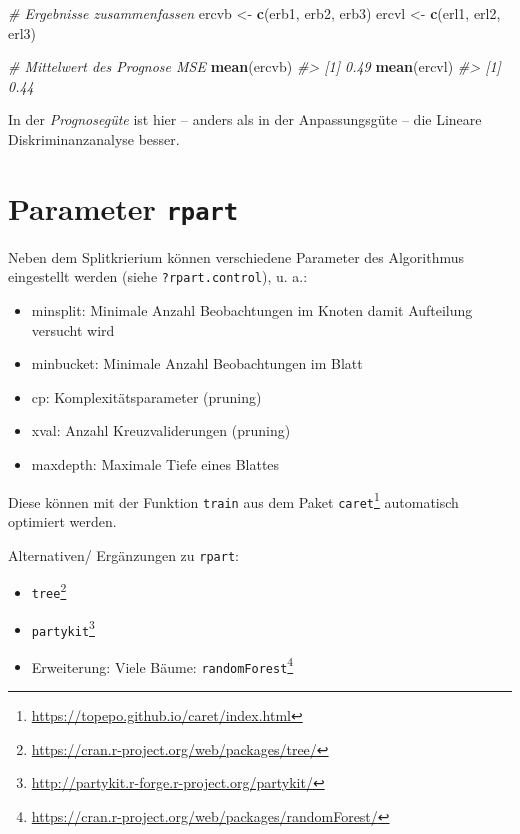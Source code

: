 \documentclass[12pt,]{book}
\makeatletter
\newenvironment{Shaded}{\begin{snugshade}}{\end{snugshade}}
\newcommand{\KeywordTok}[1]{\textcolor[rgb]{0.13,0.29,0.53}{\textbf{{#1}}}}
\newcommand{\StringTok}[1]{\textcolor[rgb]{0.31,0.60,0.02}{{#1}}}
\newcommand{\CommentTok}[1]{\textcolor[rgb]{0.56,0.35,0.01}{\textit{{#1}}}}
\newcommand{\NormalTok}[1]{{#1}}
\providecommand{\tightlist}{%
  \setlength{\itemsep}{0pt}\setlength{\parskip}{0pt}}
\renewcommand{\href}[2]{#2\footnote{\url{#1}}}
\newenvironment{kframe}{%
\medskip{}
\setlength{\fboxsep}{.8em}
 \def\at@end@of@kframe{}%
 \ifinner\ifhmode%
  \def\at@end@of@kframe{\end{minipage}}%
  \begin{minipage}{\columnwidth}%
 \fi\fi%
 \def\FrameCommand##1{\hskip\@totalleftmargin \hskip-\fboxsep
 \colorbox{shadecolor}{##1}\hskip-\fboxsep
     \hskip-\linewidth \hskip-\@totalleftmargin \hskip\columnwidth}%
 \MakeFramed {\advance\hsize-\width
   \@totalleftmargin\z@ \linewidth\hsize
   \@setminipage}}%
 {\par\unskip\endMakeFramed%
 \at@end@of@kframe}
\renewenvironment{Shaded}{\begin{kframe}}{\end{kframe}}
\makeatother
\begin{document}
\begin{Shaded}
\begin{Highlighting}[]
\CommentTok{# Ergebnisse zusammenfassen}
\NormalTok{ercvb <-}\StringTok{ }\KeywordTok{c}\NormalTok{(erb1, erb2, erb3)}
\NormalTok{ercvl <-}\StringTok{ }\KeywordTok{c}\NormalTok{(erl1, erl2, erl3)}

\CommentTok{# Mittelwert des Prognose MSE}
\KeywordTok{mean}\NormalTok{(ercvb)}
\CommentTok{#> [1] 0.49}
\KeywordTok{mean}\NormalTok{(ercvl)}
\CommentTok{#> [1] 0.44}
\end{Highlighting}
\end{Shaded}

In der \emph{Prognosegüte} ist hier -- anders als in der Anpassungsgüte
-- die Lineare Diskriminanzanalyse besser.

\section{\texorpdfstring{Parameter
\texttt{rpart}}{Parameter rpart}}\label{parameter-rpart}

Neben dem Splitkrierium können verschiedene Parameter des Algorithmus
eingestellt werden (siehe \texttt{?rpart.control}), u. a.:

\begin{itemize}
\tightlist
\item
  minsplit: Minimale Anzahl Beobachtungen im Knoten damit Aufteilung
  versucht wird
\item
  minbucket: Minimale Anzahl Beobachtungen im Blatt
\item
  cp: Komplexitätsparameter (pruning)
\item
  xval: Anzahl Kreuzvaliderungen (pruning)
\item
  maxdepth: Maximale Tiefe eines Blattes
\end{itemize}

Diese können mit der Funktion \texttt{train} aus dem Paket
\href{https://topepo.github.io/caret/index.html}{\texttt{caret}}
automatisch optimiert werden.

Alternativen/ Ergänzungen zu \texttt{rpart}:

\begin{itemize}
\tightlist
\item
  \href{https://cran.r-project.org/web/packages/tree/}{\texttt{tree}}
\item
  \href{http://partykit.r-forge.r-project.org/partykit/}{\texttt{partykit}}
\item
  Erweiterung: Viele Bäume:
  \href{https://cran.r-project.org/web/packages/randomForest/}{\texttt{randomForest}}
\end{itemize}
\end{document}
